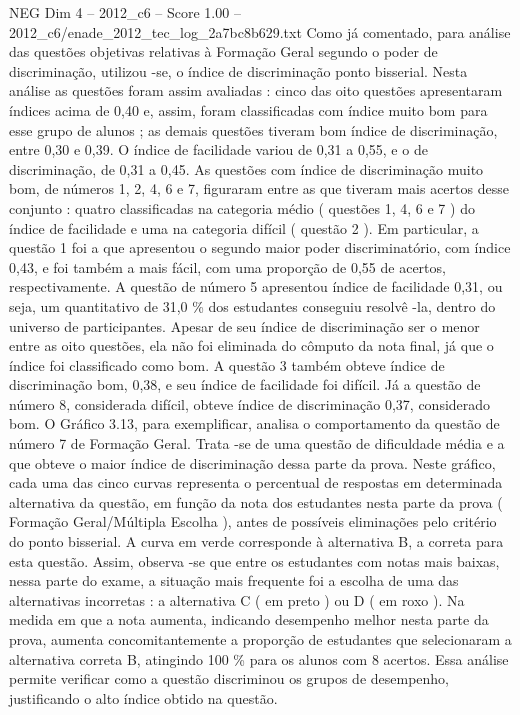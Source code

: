 \begin{textsample}{NEG Dim 4 – 2012\_c6 – Score 1.00 – 2012\_c6/enade\_2012\_tec\_log\_2a7bc8b629.txt}
Como já comentado, para análise das questões objetivas relativas à Formação Geral segundo o poder de discriminação, utilizou -se, o índice de discriminação ponto bisserial.
Nesta análise as questões foram assim avaliadas : cinco das oito questões apresentaram índices acima de 0,40 e, assim, foram classificadas com índice muito bom para esse grupo de alunos ; as demais questões tiveram bom índice de discriminação, entre 0,30 e 0,39.
O índice de facilidade variou de 0,31 a 0,55, e o de discriminação, de 0,31 a 0,45.
As questões com índice de discriminação muito bom, de números 1, 2, 4, 6 e 7, figuraram entre as que tiveram mais acertos desse conjunto : quatro classificadas na categoria médio ( questões 1, 4, 6 e 7 ) do índice de facilidade e uma na categoria difícil ( questão 2 ).
Em particular, a questão 1 foi a que apresentou o segundo maior poder discriminatório, com índice 0,43, e foi também a mais fácil, com uma proporção de 0,55 de acertos, respectivamente.
A questão de número 5 apresentou índice de facilidade 0,31, ou seja, um quantitativo de 31,0 \% dos estudantes conseguiu resolvê -la, dentro do universo de participantes.
Apesar de seu índice de discriminação ser o menor entre as oito questões, ela não foi eliminada do cômputo da nota final, já que o índice foi classificado como bom.
A questão 3 também obteve índice de discriminação bom, 0,38, e seu índice de facilidade foi difícil.
Já a questão de número 8, considerada difícil, obteve índice de discriminação 0,37, considerado bom.
O Gráfico 3.13, para exemplificar, analisa o comportamento da questão de número 7 de Formação Geral.
Trata -se de uma questão de dificuldade média e a que obteve o maior índice de discriminação dessa parte da prova.
Neste gráfico, cada uma das cinco curvas representa o percentual de respostas em determinada alternativa da questão, em função da nota dos estudantes nesta parte da prova ( Formação Geral/Múltipla Escolha ), antes de possíveis eliminações pelo critério do ponto bisserial.
A curva em verde corresponde à alternativa B, a correta para esta questão.
Assim, observa -se que entre os estudantes com notas mais baixas, nessa parte do exame, a situação mais frequente foi a escolha de uma das alternativas incorretas : a alternativa C ( em preto ) ou D ( em roxo ).
Na medida em que a nota aumenta, indicando desempenho melhor nesta parte da prova, aumenta concomitantemente a proporção de estudantes que selecionaram a alternativa correta B, atingindo 100 \% para os alunos com 8 acertos.
Essa análise permite verificar como a questão discriminou os grupos de desempenho, justificando o alto índice obtido na questão.

\end{textsample}
